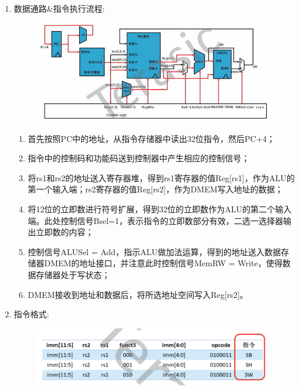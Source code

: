 \documentclass[a4paper, 14pt, oneside]{book} %
\numberwithin{equation}{subsection}
\begin{document}
\begin{enumerate}
\begin{enumerate}
\begin{figure}[H]
								\end{figure}
						\item{数据通路\&指令执行流程:}
							\begin{figure}[H]
								\centering
								\includegraphics[scale=0.5]{img/s2.png}
							\end{figure}
							\begin{enumerate}
								\item
									首先按照PC中的地址，从指令存储器中读出32位指令，然后PC+4；
								\item
									指令中的控制码和功能码送到控制器中产生相应的控制信号；
								\item
									将rs1和rs2的地址送入寄存器堆，得到rs1寄存器的值Reg[rs1]，作为ALU的第一个输入端；rs2寄存器的值Reg[rs2]，作为DMEM写入地址的数据；
								\item
									将12位的立即数进行符号扩展，得到32位的立即数作为ALU的第二个输入端。此处控制信号Bsel=1，表示指令的立即数部分有效，二选一选择器输出立即数的内容；
								\item
									控制信号ALUSel = Add，指示ALU做加法运算，得到的地址送入数据存储器DMEM的地址接口，并注意此时控制信号MemRW = Write，使得数据存储器处于写状态；
								\item 
									DMEM接收到地址和数据后，将所选地址空间写入Reg[rs2]。
							\end{enumerate}
						\item{指令格式:}
							\begin{figure}[H]
								\centering
								\includegraphics[scale=0.5]{img/s3.png}
							\end{figure}
					\end{enumerate}

\end{enumerate}
\end{document}
